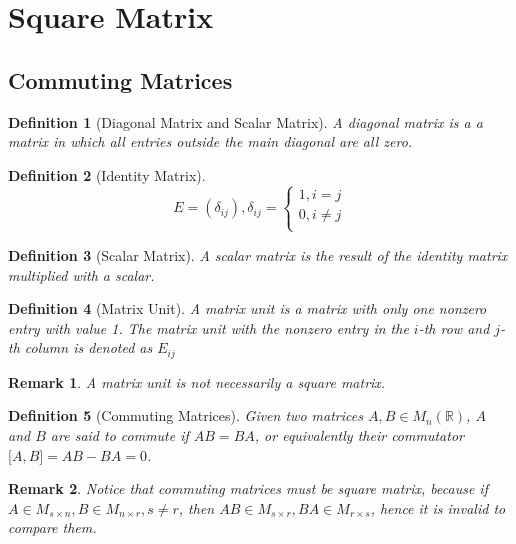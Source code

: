 \documentclass[onecolumn]{ctexart}
\newtheorem{definition}{Definition}
\newtheorem{remark}{Remark}
\begin{document}
\section{Square Matrix}

\subsection{Commuting Matrices}

\begin{definition}[Diagonal Matrix and Scalar Matrix]
  A diagonal matrix is a a matrix in which all entries outside the main diagonal 
  are all zero.
\end{definition}

\begin{definition}[Identity Matrix]
  \begin{equation}
    E = (\delta_{ij}), \delta_{ij} = 
    \begin{cases}
      1, i = j \\
      0, i \neq j \\
    \end{cases}
  \end{equation}
\end{definition}

\begin{definition}[Scalar Matrix]
  A scalar matrix is the result of the identity matrix multiplied with a scalar.
\end{definition}

\begin{definition}[Matrix Unit]
  A matrix unit is a matrix with only one nonzero entry with value 1. The matrix 
  unit with the nonzero entry in the $i$-th row and $j$-th column is denoted as 
  $E_{ij}$
\end{definition}
\begin{remark}
  A matrix unit is not necessarily a square matrix.
\end{remark}

\begin{definition}[Commuting Matrices]
  Given two matrices $A, B \in M_n(\mathbb{R})$, $A$ and $B$ are said to commute 
  if $AB = BA$, or equivalently their commutator $\lbrack A, B \rbrack = AB - BA 
  = 0$.
\end{definition}
\begin{remark}
  Notice that commuting matrices must be square matrix, because if $A \in M_{s 
  \times n}, B \in M_{n \times r}, s \neq r$, then $AB \in M_{s \times r}, BA 
  \in M_{r \times s}$, hence it is invalid to compare them.
\end{remark}
\end{document}
